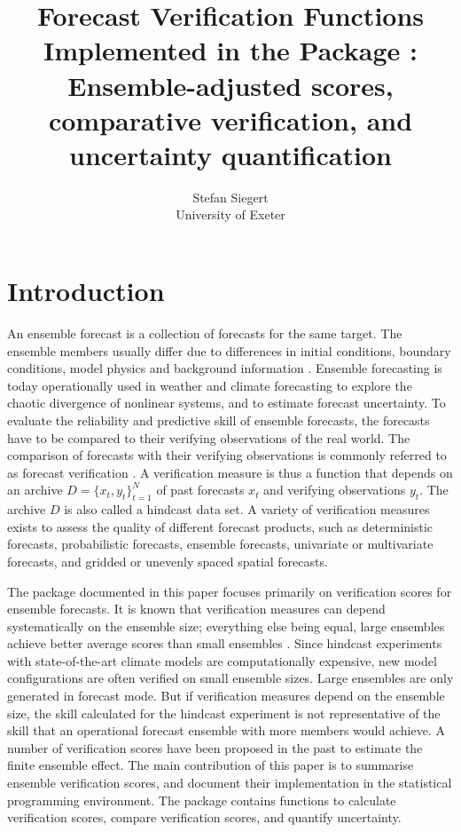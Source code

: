 \documentclass[article]{jss}\usepackage{graphicx, color}
\author{Stefan Siegert\\University of Exeter}
\title{Forecast Verification Functions Implemented in the \proglang{R} Package \pkg{SpecsVerification}: Ensemble-adjusted scores, comparative verification, and uncertainty quantification}
\begin{document}


\section{Introduction}

An ensemble forecast is a collection of forecasts for the same target.
The ensemble members usually differ due to differences in initial conditions, boundary conditions, model physics and background information \citep{gneiting2005atmospheric, leutbecher2008ensemble}.
Ensemble forecasting is today operationally used in weather and climate forecasting to explore the chaotic divergence of nonlinear systems, and to estimate forecast uncertainty.
To evaluate the reliability and predictive skill of ensemble forecasts, the forecasts have to be compared to their verifying observations of the real world.
%
The comparison of forecasts with their verifying observations is commonly referred to as forecast verification \citep{jolliffe2012forecast}.
A verification measure is thus a function that depends on an archive $D=\{x_t, y_t\}_{t=1}^N$ of past forecasts $x_t$ and verifying observations $y_t$.
The archive $D$ is also called a hindcast data set.
A variety of verification measures exists to assess the quality of different forecast products, such as deterministic forecasts, probabilistic forecasts, ensemble forecasts, univariate or multivariate forecasts, and gridded or unevenly spaced spatial forecasts.


The  package  documented in this paper focuses primarily on verification scores for ensemble forecasts.
It is known that verification measures can depend systematically on the ensemble size; everything else being equal, large ensembles achieve better average scores than small ensembles \citep{buizza1998impact}.
Since hindcast experiments with state-of-the-art climate models are computationally expensive, 
new model configurations are often verified on small ensemble sizes.
Large ensembles are only generated in forecast mode.
But if verification measures depend on the ensemble size, the skill calculated for the hindcast experiment is not representative of the skill that an operational forecast ensemble with more members would achieve.
A number of verification scores have been proposed in the past to estimate the finite ensemble effect.
The main contribution of this paper is to summarise ensemble verification scores, and document their implementation in the  statistical programming environment.
The package  contains functions to calculate verification scores, compare verification scores, and quantify uncertainty.
\end{document}
